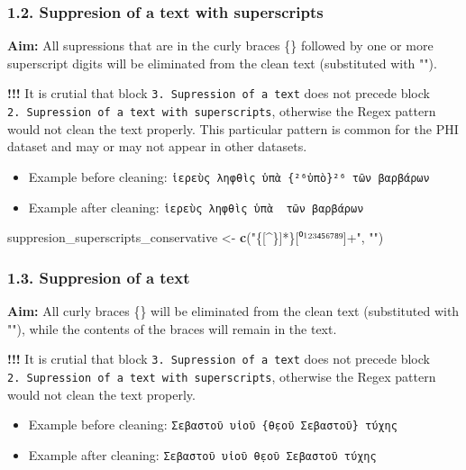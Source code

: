 \documentclass[]{article}
\newenvironment{Shaded}{\begin{snugshade}}{\end{snugshade}}
\newcommand{\KeywordTok}[1]{\textcolor[rgb]{0.13,0.29,0.53}{\textbf{#1}}}
\newcommand{\NormalTok}[1]{#1}
\newcommand{\StringTok}[1]{\textcolor[rgb]{0.31,0.60,0.02}{#1}}
\providecommand{\tightlist}{%
  \setlength{\itemsep}{0pt}\setlength{\parskip}{0pt}}
\begin{document}
\hypertarget{suppresion-of-a-text-with-superscripts}{%
\subsubsection{1.2. Suppresion of a text with
superscripts}\label{suppresion-of-a-text-with-superscripts}}

\textbf{Aim:} All supressions that are in the curly braces \{\} followed
by one or more superscript digits will be eliminated from the clean text
(substituted with "").

\textbf{!!!} It is crutial that block
\texttt{3.\ Supression\ of\ a\ text} does not precede block
\texttt{2.\ Supression\ of\ a\ text\ with\ superscripts}, otherwise the
Regex pattern would not clean the text properly. This particular pattern
is common for the PHI dataset and may or may not appear in other
datasets.

\begin{itemize}
\tightlist
\item
  Example before cleaning:
  \texttt{ἱερεὺς\ ληφθὶς\ ὑπὰ\ \{²⁶ὑπὸ\}²⁶\ τῶν\ βαρβάρων}
\item
  Example after cleaning: \texttt{ἱερεὺς\ ληφθὶς\ ὑπὰ\ \ τῶν\ βαρβάρων}
\end{itemize}

\begin{Shaded}
\begin{Highlighting}[]
\NormalTok{suppresion_superscripts_conservative <-}\StringTok{ }\KeywordTok{c}\NormalTok{(}\StringTok{"\{[^\}]*\}[⁰¹²³⁴⁵⁶⁷⁸⁹]+"}\NormalTok{, }\StringTok{""}\NormalTok{)}
\end{Highlighting}
\end{Shaded}

\hypertarget{suppresion-of-a-text}{%
\subsubsection{1.3. Suppresion of a text}\label{suppresion-of-a-text}}

\textbf{Aim:} All curly braces \{\} will be eliminated from the clean
text (substituted with ""), while the contents of the braces will remain
in the text.

\textbf{!!!} It is crutial that block
\texttt{3.\ Supression\ of\ a\ text} does not precede block
\texttt{2.\ Supression\ of\ a\ text\ with\ superscripts}, otherwise the
Regex pattern would not clean the text properly.

\begin{itemize}
\tightlist
\item
  Example before cleaning:
  \texttt{Σεβαστοῦ\ υἱοῦ\ \{θ̣εοῦ\ Σεβαστοῦ\}\ τύχης}
\item
  Example after cleaning: \texttt{Σεβαστοῦ\ υἱοῦ\ θ̣εοῦ\ Σεβαστοῦ\ τύχης}
\end{itemize}
\end{document}
